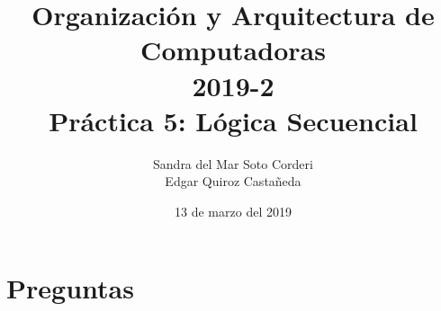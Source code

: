 \documentclass{article}
\begin{document}
    \title{
        Organización y Arquitectura de Computadoras \\
        2019-2 \\
        Práctica 5: Lógica Secuencial
    }
    \author{
        Sandra del Mar Soto Corderi \\
        Edgar Quiroz Castañeda
    }
    \date{
        13 de marzo del 2019
    }

    \maketitle

    \section{Preguntas}
\end{document}
